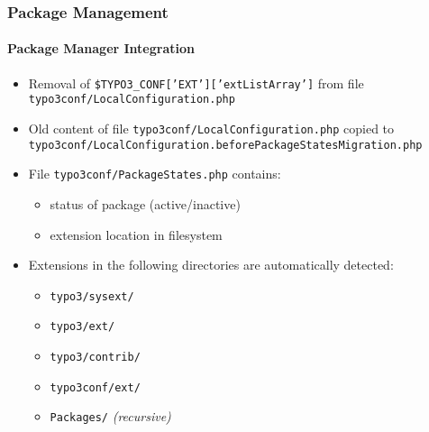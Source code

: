 
\begin{frame}[fragile]
	\frametitle{Package Management}
	\framesubtitle{Package Manager Integration}

	\begin{itemize}
		\item Removal of \texttt{\$TYPO3\_CONF['EXT']['extListArray']} from file\newline
			\smaller\texttt{typo3conf/LocalConfiguration.php}\normalsize

		\item Old content of file \small\texttt{typo3conf/LocalConfiguration.php} copied to\normalsize\newline
			\smaller\texttt{typo3conf/LocalConfiguration.beforePackageStatesMigration.php}\normalsize

		\item File \texttt{typo3conf/PackageStates.php} contains:

			\begin{itemize}
				\item status of package (active/inactive)
				\item extension location in filesystem
			\end{itemize}

		\item Extensions in the following directories are automatically detected:

			\begin{itemize}
				\item \texttt{typo3/sysext/}
				\item \texttt{typo3/ext/}
				\item \texttt{typo3/contrib/}
				\item \texttt{typo3conf/ext/}
				\item \texttt{Packages/} \emph{(recursive)}
			\end{itemize}

	\end{itemize}

\end{frame}


